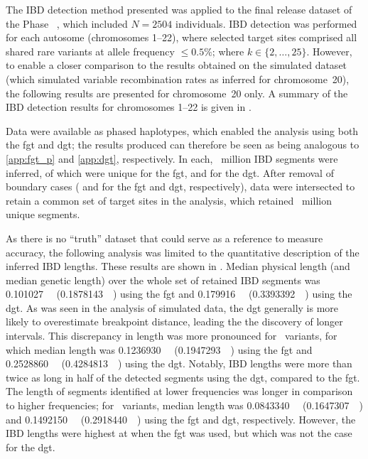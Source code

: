 The IBD detection method presented was applied to the final release dataset of the  Phase~ \citep{GenomesProjectConsortium:2012co,Auton:2015gk}, which included ${N=\num{2504}}$ individuals.
IBD detection was performed for each autosome (chromosomes 1--22), where selected target sites comprised all shared rare variants at allele frequency ${\leq 0.5\%}$; \ie \fk{} where ${k \in \{2, \ldots, 25\}}$.
However, to enable a closer comparison to the results obtained on the simulated dataset (which simulated variable recombination rates as inferred for chromosome~20), the following results are presented for chromosome~20 only.
A summary of the IBD detection results for chromosomes 1--22 is given in .

%

%

Data were available as phased haplotypes, which enabled the analysis using both the \gls{fgt} and \gls{dgt}; \ie the results produced can therefore be seen as being analogous to \cref{app:fgt_p} and \cref{app:dgt}, respectively.
In each, ~million IBD segments were inferred, of which  were unique for the \gls{fgt}, and  for the \gls{dgt}.
After removal of boundary cases ( and  for the \gls{fgt} and \gls{dgt}, respectively), data were intersected to retain a common set of target sites in the analysis, which retained ~million unique segments.

%

%

As there is no ``truth'' dataset that could serve as a reference to measure accuracy, the following analysis was limited to the quantitative description of the inferred IBD lengths.
These results are shown in .
Median physical length (and median genetic length) over the whole set of retained IBD segments was
\SI{0.101027}{\mega\basepair} (\SI{0.1878143}{\centi\morgan}) using the \gls{fgt} and
\SI{0.179916}{\mega\basepair} (\SI{0.3393392}{\centi\morgan}) using the \gls{dgt}.
As was seen in the analysis of simulated data, the \gls{dgt} generally is more likely to overestimate breakpoint distance, leading the the discovery of longer intervals.
This discrepancy in length was more pronounced for ~variants, for which median length was
\SI{0.1236930}{\mega\basepair} (\SI{0.1947293}{\centi\morgan}) using the \gls{fgt} and
\SI{0.2528860}{\mega\basepair} (\SI{0.4284813}{\centi\morgan}) using the \gls{dgt}.
Notably, IBD lengths were more than twice as long in half of the detected segments using the \gls{dgt}, compared to the \gls{fgt}.
The length of segments identified at lower frequencies was longer in comparison to higher frequencies; \eg for ~variants, median length was
\SI{0.0843340}{\mega\basepair} (\SI{0.1647307}{\centi\morgan}) and
\SI{0.1492150}{\mega\basepair} (\SI{0.2918440}{\centi\morgan}) using the \gls{fgt} and \gls{dgt}, respectively.
However, the IBD lengths were highest at \fk{[3,5]} when the \gls{fgt} was used, but which was not the case for the \gls{dgt}.





